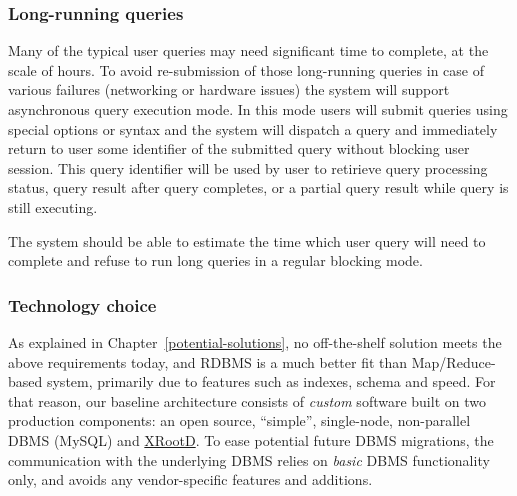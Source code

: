 \documentclass[DM,lsstdraft,toc]{lsstdoc}
\begin{document}
\subsubsection{Long-running queries}\label{long-running-queries}

Many of the typical user queries may need significant time to complete,
at the scale of hours. To avoid re-submission of those long-running
queries in case of various failures (networking or hardware issues) the
system will support asynchronous query execution mode. In this mode
users will submit queries using special options or syntax and the system
will dispatch a query and immediately return to user some identifier of
the submitted query without blocking user session. This query identifier
will be used by user to retirieve query processing status, query result
after query completes, or a partial query result while query is still
executing.

The system should be able to estimate the time which user query will
need to complete and refuse to run long queries in a regular blocking
mode.

\subsubsection{Technology choice}\label{technology-choice}

As explained in Chapter~\ref{potential-solutions},
no off-the-shelf solution meets the above requirements today, and RDBMS
is a much better fit than Map/Reduce-based system, primarily due to
features such as indexes, schema and speed. For that reason, our
baseline architecture consists of \emph{custom} software built on two
production components: an open source, ``simple'', single-node,
non-parallel DBMS (MySQL) and \href{http://xrootd.org}{XRootD}. To ease
potential future DBMS migrations, the communication with the underlying
DBMS relies on \emph{basic} DBMS functionality only, and avoids any
vendor-specific features and additions.
\end{document}
